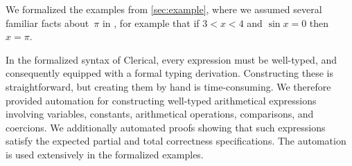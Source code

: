 \begin{description}[style=nextline,font=\normalfont]
\item[\coqpath{examples}, \coqpath{Mathematics}, \coqpath{Arith}]
  We formalized the examples from \cref{sec:example}, where we assumed several familiar facts about~$\pi$ in , for example that if $3 < x < 4$ and $\sin x = 0$ then $x = \pi$.

\item[\coqpath{Arith}]
  In the formalized syntax of Clerical, every expression must be well-typed, and consequently equipped with
  a formal typing derivation. Constructing these is straightforward, but creating them by hand is time-consuming.
  We therefore provided automation for constructing well-typed arithmetical expressions involving variables,
  constants, arithmetical operations, comparisons, and coercions.
  We additionally automated proofs showing that such expressions satisfy the expected partial and total correctness specifications.
  The automation is used extensively in the formalized examples.
\end{description}








 